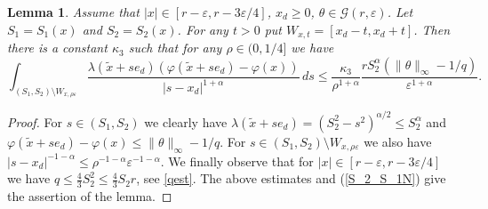 \documentclass[a4paper,12pt,reqno]{amsart}
\newtheorem{lemma}[theorem]{Lemma}
\theoremstyle{definition}
\theoremstyle{remark}
\newcommand{\eps}{\varepsilon}
\newcommand{\calG}{\mathcal{G}}
\begin{document}
\begin{lemma}
\label{estimates_S_1_S_2_minus_W}
Assume that $|x| \in [r - \eps, r - 3\eps/4]$, $x_d \ge 0$, $\theta \in \calG(r,\eps)$. Let $S_1= S_1(x)$ and $S_2= S_2(x)$. For any $t > 0$ put $W_{x, t} = [x_d - t, x_d + t]$. Then there is a constant $\kappa_3$ such that for any $\rho \in (0,1/4]$ we have
$$
\int_{(S_1,S_2) \setminus W_{x, \rho \eps}} 
\frac{\lambda(\tilde{x} + s e_d) (\varphi(\tilde{x} + s e_d) - \varphi(x)) }{|s - x_d|^{1 + \alpha}} \, ds
\le \frac{\kappa_3}{\rho^{1 + \alpha}} 
\frac{r S^{\alpha}_2 (\|\theta\|_{\infty} - 1/q)}{ \eps^{1 + \alpha}}.
$$
\end{lemma}
\begin{proof}
For $s \in (S_1,S_2)$ we clearly have 
$\lambda(\tilde{x} + s e_d) = (S_2^2-s^2)^{\alpha/2}\le S^{\alpha}_2$ and $\varphi(\tilde{x} + s e_d) - \varphi(x) \le \|\theta\|_{\infty} - 1/q$. For $s \in (S_1,S_2) \setminus W_{x, \rho \eps}$ we also have $|s - x_d|^{-1 - \alpha} \le \rho^{-1 - \alpha} \eps^{-1 - \alpha}$. We finally observe that  for $|x| \in [r - \eps, r - 3\eps/4]$ we have  $q\le \frac43S^2_2\le \frac43S_2r$, see \eqref{qest}. The above estimates and (\ref{S_2_S_1N}) give the assertion of the lemma.
\end{proof}
\end{document}
